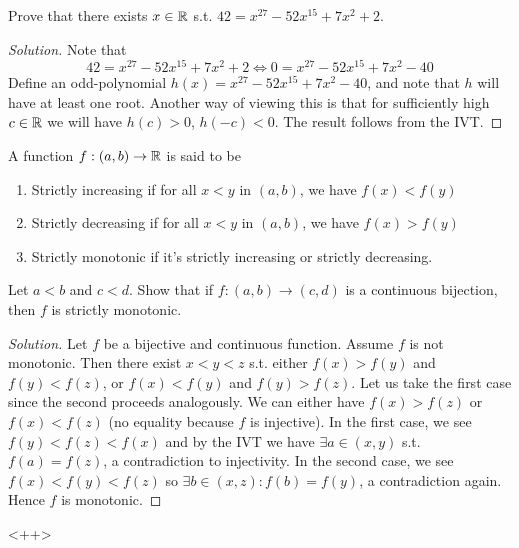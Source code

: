 \begin{example}
Prove that there exists $x\in\mathbb R$ s.t. $42=x^{27}-52x^{15}+7x^2+2$.
\end{example}
\begin{proof}[Solution]
  Note that 
  \[42=x^{27}-52x^{15}+7x^2+2 \iff 0=x^{27}-52x^{15}+7x^2-40\]
  Define an odd-polynomial $h(x)=x^{27}-52x^{15}+7x^2-40$, and note that $h$ will have at
  least one root. Another way of viewing this is that for sufficiently high $c\in\mathbb R$ we
  will have $h(c)>0$, $h(-c)<0$. The result follows from the IVT.
\end{proof}


\begin{exercise}
  A function $f:(a,b)\to\mathbb R$ is said to be
  \begin{enumerate}
    \item Strictly increasing if for all $x<y$ in $(a,b)$, we have $f(x)<f(y)$
    \item Strictly decreasing if for all $x<y$ in $(a,b)$, we have $f(x)>f(y)$
    \item Strictly monotonic if it's strictly increasing or strictly decreasing. 
  \end{enumerate}
  Let $a<b$ and $c<d$. Show that if $f:(a,b)\to (c,d)$ is a continuous bijection, then $f$
  is strictly monotonic.
  \label{ex:bijImpliesMonot}
\end{exercise}
\begin{proof}[Solution]
  Let $f$ be a bijective and continuous function. Assume $f$ is not monotonic. Then there
  exist $x<y<z$ s.t. either $f(x)>f(y)$ and $f(y)<f(z)$, or $f(x)<f(y)$ and $f(y)>f(z)$.
  Let us take the first case since the second proceeds analogously. We can either have
  $f(x)>f(z)$ or $f(x)<f(z)$ (no equality because $f$ is injective). In the first case, we
  see $f(y)<f(z)<f(x)$ and by the IVT we have $\exists a\in(x,y)$ s.t. $f(a)=f(z)$, a
  contradiction to injectivity. In the second case, we see $f(x)<f(y)<f(z)$ so $\exists
  b\in(x,z) : f(b)=f(y)$, a contradiction again. Hence $f$ is monotonic.
\end{proof}<++>

